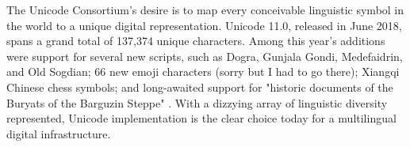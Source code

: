 The Unicode Consortium's desire is to map every conceivable linguistic symbol in
the world to a unique digital representation. Unicode 11.0, released in June
2018, spans a grand total of 137,374 unique characters. Among this year's
additions were support for several new scripts, such as Dogra, Gunjala Gondi,
Medefaidrin, and Old Sogdian; 66 new emoji characters (sorry but I had to go
there); Xiangqi Chinese chess symbols; and long-awaited support for "historic
documents of the Buryats of the Barguzin Steppe" \parencite{unicode11}. With a
dizzying array of linguistic diversity represented, Unicode implementation is
the clear choice today for a multilingual digital infrastructure.
